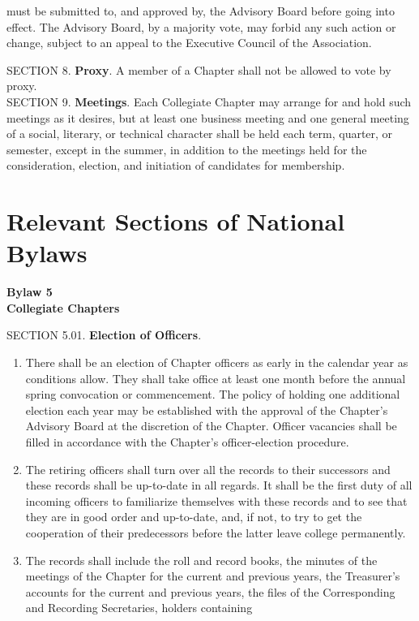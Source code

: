 \begin{optionalpart}
\begin{enumerate}
must be submitted to, and approved by, the Advisory Board before going into effect. The 
Advisory Board, by a majority vote, may forbid any such action or change, subject to an 
appeal to the Executive Council of the Association.
\end{enumerate}
SECTION 8. {\bf Proxy}. A member of a Chapter shall not be allowed to vote by proxy.\\[1em]
SECTION 9. {\bf Meetings}. Each Collegiate Chapter may arrange for and hold such meetings as it desires, but at least one business meeting and one general meeting of a social, 
literary, or technical character shall be held each term, quarter, or semester, except in the 
summer, in addition to the meetings held for the consideration, election, and initiation of 
candidates for membership.\\[1em]
\part{Relevant Sections of National Bylaws}
\setcounter{chapter}{5}
\setcounter{section}{3}
\begin{center}
{\bf Bylaw 5\\
Collegiate Chapters}
\end{center}
SECTION 5.01. {\bf Election of Officers}.
\begin{enumerate}
\item There shall be an election of Chapter officers as early 
in the calendar year as conditions allow. They shall take office at least one month before the annual 
spring convocation or commencement. The policy of holding one additional election each year may 
be established with the approval of the Chapter's Advisory Board at the discretion of the Chapter. 
Officer vacancies shall be filled in accordance with the Chapter's officer-election procedure.
\item The retiring officers shall turn over all the records to their successors and these records 
shall be up-to-date in all regards. It shall be the first duty of all incoming officers to familiarize 
themselves with these records and to see that they are in good order and up-to-date, and, if not, 
to try to get the cooperation of their predecessors before the latter leave college permanently.
\item The records shall include the roll and record books, the minutes of the meetings of 
the Chapter for the current and previous years, the Treasurer's accounts for the current and 
previous years, the files of the Corresponding and Recording Secretaries, holders containing 

\end{enumerate}
\end{optionalpart}
